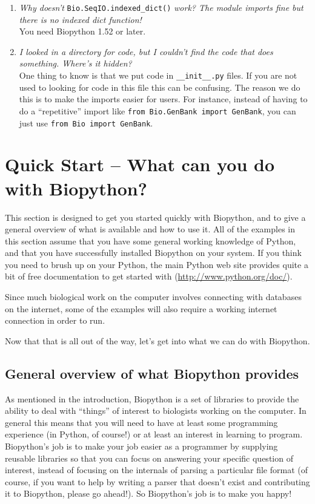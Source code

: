 \documentclass{report}
\begin{document}
\begin{enumerate}
 \item \emph{Why doesn't} \verb|Bio.SeqIO.indexed_dict()| \emph{work? The module imports fine but there is no indexed dict function!} \\
  You need Biopython 1.52 or later.
  
  \item \emph{I looked in a directory for code, but I couldn't find the code that does something. Where's it hidden?} \\
  One thing to know is that we put code in \verb|__init__.py| files. If you are not used to looking for code in this file this can be confusing. The reason we do this is to make the imports easier for users. For instance, instead of having to do a ``repetitive'' import like \verb|from Bio.GenBank import GenBank|, you can just use \verb|from Bio import GenBank|.

\end{enumerate}

\chapter{Quick Start -- What can you do with Biopython?}
\label{chapter:quick-start}

This section is designed to get you started quickly with Biopython, and to give a general overview of what is available and how to use it. All of the examples in this section assume that you have some general working knowledge of Python, and that you have successfully installed Biopython on your system. If you think you need to brush up on your Python, the main Python web site provides quite a bit of free documentation to get started with (\url{http://www.python.org/doc/}).

Since much biological work on the computer involves connecting with databases on the internet, some of the examples will also require a working internet connection in order to run.

Now that that is all out of the way, let's get into what we can do with Biopython.

\section{General overview of what Biopython provides}

As mentioned in the introduction, Biopython is a set of libraries to provide the ability to deal with ``things'' of interest to biologists working on the computer. In general this means that you will need to have at least some programming experience (in Python, of course!) or at least an interest in learning to program. Biopython's job is to make your job easier as a programmer by supplying reusable libraries so that you can focus on answering your specific question of interest, instead of focusing on the internals of parsing a particular file format (of course, if you want to help by writing a parser that doesn't exist and contributing it to Biopython, please go ahead!). So Biopython's job is to make you happy!
\end{document}
